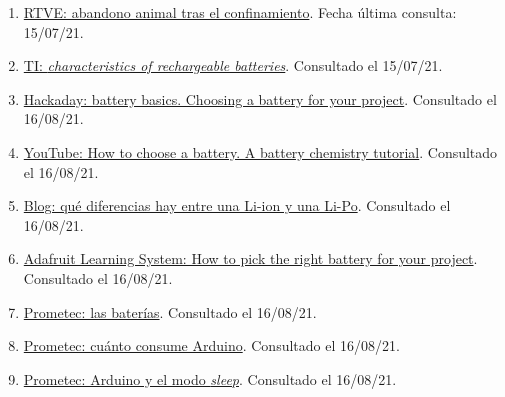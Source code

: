 \documentclass[12pt]{article}
\begin{document}
\begin{enumerate}
			\item
			\label{bib: enlace RTVE} \href{https://www.rtve.es/noticias/20200608/abandonos-animales-domesticos-se-han-disparado-espana-durante-meses-confinamiento/2015761.shtml}{RTVE: abandono animal tras el confinamiento}. Fecha última consulta: 15/07/21.
			
			\item
			\label{bib: TI rechargeable batteries}
			\href{https://www.ti.com/lit/an/snva533/snva533.pdf}{TI: \textit{characteristics of rechargeable batteries}}. Consultado el 15/07/21.
			
			\item 
			\label{bib: Hackaday battery basics}
			\href{https://hackaday.com/2014/12/16/battery-basics-choosing-a-battery-for-your-project/}{Hackaday: battery basics. Choosing a battery for your project}. Consultado el 16/08/21.

			\item 
			\label{bib: YouTube How to choose  a battery}
			\href{https://www.youtube.com/watch?v=saxYilLJ7yw}{YouTube: How to choose a battery. A battery chemistry tutorial}. Consultado el 16/08/21.
			
			\item 
			\label{bib: blog diferencias li-ion y li-po}
			\href{https://blog.330ohms.com/2020/06/22/que-diferencias-hay-entre-una-li-po-y-una-li-ion/}{Blog: qué diferencias hay entre una Li-ion y una Li-Po}. Consultado el 16/08/21.
			
			\item 
			\label{bib: adafruit pick the right battery}
			\href{https://learn.adafruit.com/all-about-batteries/how-to-pick-the-right-battery-for-your-project}{Adafruit Learning System: How to pick the right battery for your project}. Consultado el 16/08/21.
			
			\item 
			\label{bib: prometec baterías para proyectos con arduino}
			\href{https://www.prometec.net/arduino-baterias/}{Prometec: las baterías}. Consultado el 16/08/21.
			
			\item 
			\label{bib: prometec consumo Arduino}
			\href{https://www.prometec.net/consumos-arduino/}{Prometec: cuánto consume Arduino}. Consultado el 16/08/21.
			
			\item 
			\label{bib: prometec modo sleep arduino}
			\href{https://www.prometec.net/el-modo-sleep-en-arduino/}{Prometec: Arduino y el modo \textit{sleep}}. Consultado el 16/08/21.
			

\end{enumerate}
\end{document}
